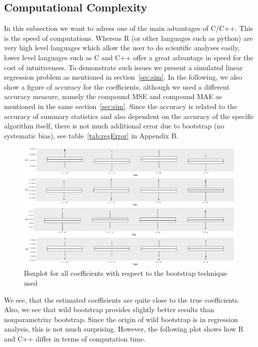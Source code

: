 \subsection{Computational Complexity}

In this subsection we want to adress one of the main advantages of C/C++. This is the speed of computations. Whereas R (or other languages such as python) are very high level languages which allow the user to do scientific analyses easily, lower level languages such as C and C++ offer a great advantage in speed for the cost of intuitiveness. To demonstrate such issues we present a simulated linear regression problem as mentioned in section~\ref{sec:sim}. In the following, we also show a figure of accuracy for the coefficients, although we used a different accuracy measure, namely the compound MSE and compound MAE as mentioned in the same section~\ref{sec:sim}. Since the accuracy is related to the accuracy of summary statistics and also dependent on the accuracy of the specific algorithm itself, there is not much additional error due to bootstrap (no systematic bias), see table~\ref{tab:regError} in Appendix B. 

\begin{figure}\label{fig:regErr}
	\includegraphics[scale=0.3]{./figures/plot_regression_error.pdf}
	\caption[Boxplot Coefficients]{Boxplot for all coefficients with respect to the bootstrap technique used}
\end{figure}

We see, that the estimated coefficients are quite close to the true coefficients. Also, we see that wild bootstrap provides slightly better results than nonparametrixc bootstrap. Since the origin of wild bootstrap is in regression analysis, this is not much surprising. However, the following plot shows how R and C++ differ in terms of computation time.

